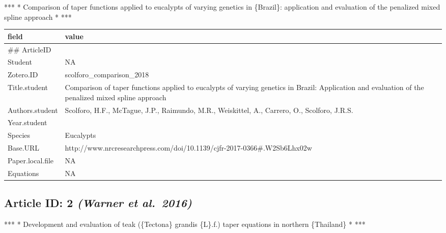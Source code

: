 \documentclass[]{article}
\begin{document}
*** * Comparison of taper functions applied to eucalypts of varying
genetics in \{Brazil\}: application and evaluation of the penalized
mixed spline approach * ***

\begin{table}[H]
\centering
\begin{tabular}{>{\raggedright\arraybackslash}p{2cm}>{\raggedright\arraybackslash}p{8cm}}
\toprule
field & value\\
\midrule
\#\# ArticleID & 1\\
Student & NA\\
Zotero.ID & scolforo\_comparison\_2018\\
Title.student & Comparison of taper functions applied to eucalypts of varying genetics in Brazil: Application and evaluation of the penalized mixed spline approach\\
Authors.student & Scolforo, H.F., McTague, J.P., Raimundo, M.R., Weiskittel, A., Carrero, O., Scolforo, J.R.S.\\
\addlinespace
Year.student & 2017\\
Species & Eucalypts\\
Base.URL & http://www.nrcresearchpress.com/doi/10.1139/cjfr-2017-0366\#.W2Sb6Lhx02w\\
Paper.local.file & NA\\
Equations & NA\\
\bottomrule
\end{tabular}
\end{table}

\hypertarget{article-id-2-warner-et-al.2016}{%
\subsection{\texorpdfstring{Article ID: 2 \textbf{\emph{(Warner et
al.~2016)}}}{Article ID: 2 (Warner et al.~2016)}}\label{article-id-2-warner-et-al.2016}}

*** * Development and evaluation of teak (\{Tectona\} grandis \{L\}.f.)
taper equations in northern \{Thailand\} * ***
\end{document}
